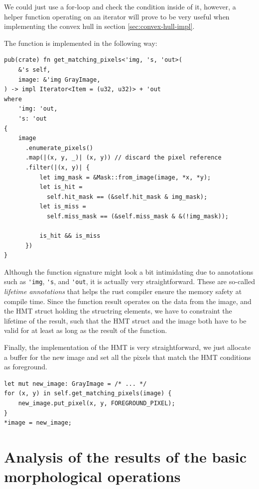 \documentclass[12pt]{article}
\begin{document}
We could just use a for-loop and check the condition inside of it, however,
a helper function operating on an iterator will prove to be very useful when implementing the convex hull in section \ref{sec:convex-hull-impl}.

The function is implemented in the following way:

\begin{lstlisting}
pub(crate) fn get_matching_pixels<'img, 's, 'out>(
    &'s self,
    image: &'img GrayImage,
) -> impl Iterator<Item = (u32, u32)> + 'out
where
    'img: 'out,
    's: 'out
{
    image
      .enumerate_pixels()
      .map(|(x, y, _)| (x, y)) // discard the pixel reference
      .filter(|(x, y)| {
          let img_mask = &Mask::from_image(image, *x, *y);
          let is_hit = 
            self.hit_mask == (&self.hit_mask & img_mask);
          let is_miss = 
            self.miss_mask == (&self.miss_mask & &(!img_mask));  
          
          is_hit && is_miss
      })
}
\end{lstlisting}

\begin{remark}
    Although the function signature might look a bit intimidating due to annotations such as \lstinline{'img}, \lstinline{'s}, and \lstinline{'out},
    it is actually very straightforward.
    These are so-called \emph{lifetime annotations} that helps the rust compiler ensure the memory safety at compile time.
    Since the function result operates on the data from the image, and the HMT struct holding the structring elements,
    we have to constraint the lifetime of the result, such that the HMT struct and the image both have to be valid for at least
    as long as the result of the function.
\end{remark}

Finally, the implementation of the HMT is very straightforward, we just allocate a buffer for the new image
and set all the pixels that match the HMT conditions as foreground.

\begin{lstlisting}
let mut new_image: GrayImage = /* ... */
for (x, y) in self.get_matching_pixels(image) {
    new_image.put_pixel(x, y, FOREGROUND_PIXEL);
}
*image = new_image;
\end{lstlisting}

\pagebreak[2]
\section{Analysis of the results of the basic morphological operations}
\end{document}
